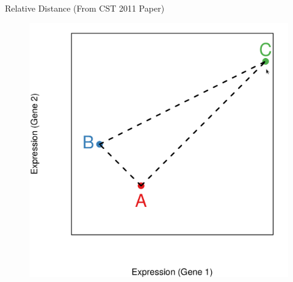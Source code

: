 \documentclass[xcolor=x11names,compress]{beamer}\usepackage[]{graphicx}\usepackage[]{color}
\begin{document}
\begin{frame}{Relative Distance (From CST 2011 Paper)}
  
  \begin{figure}
   \centering
   \includegraphics[scale=0.4]{Figures/distance.png}
 \end{figure}
\end{frame}



 

\end{document}
